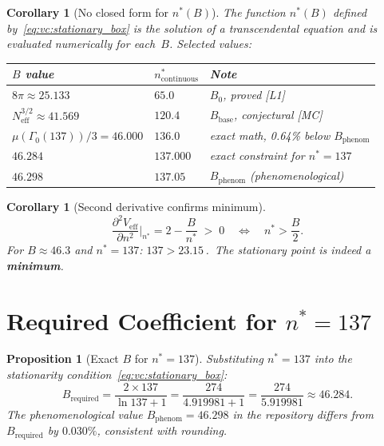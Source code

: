 \documentclass[12pt,a4paper]{article}
\newtheorem{proposition}[theorem]{Proposition}
\newtheorem{corollary}[theorem]{Corollary}
\theoremstyle{definition}
\theoremstyle{remark}
\begin{document}
\begin{corollary}[No closed form for $n^*(B)$]
The function $n^*(B)$ defined by~\eqref{eq:vc:stationary_box} is the solution
of a transcendental equation and is evaluated numerically for each~$B$.
Selected values:
\begin{center}
\begin{tabular}{lll}
\toprule
$B$ value & $n^*_{\mathrm{continuous}}$ & Note \\
\midrule
$8\pi \approx 25.133$ & $65.0$ & $B_0$, proved [L1] \\
$N_{\mathrm{eff}}^{3/2} \approx 41.569$ & $120.4$ & $B_{\mathrm{base}}$, conjectural [MC] \\
$\mu(\Gamma_0(137))/3 = 46.000$ & $136.0$ & exact math, 0.64\% below $B_{\mathrm{phenom}}$ \\
$46.284$ & $137.000$ & exact constraint for $n^* = 137$ \\
$46.298$ & $137.05$ & $B_{\mathrm{phenom}}$ (phenomenological) \\
\bottomrule
\end{tabular}
\end{center}
\end{corollary}

\begin{corollary}[Second derivative confirms minimum]
\label{cor:vc:2nd}
\[
  \frac{\partial^2 V_{\mathrm{eff}}}{\partial n^2}\bigg|_{n^*}
  = 2 - \frac{B}{n^*}
  \;>\; 0
  \quad\Longleftrightarrow\quad
  n^* > \frac{B}{2}.
\]
For $B \approx 46.3$ and $n^* = 137$: $137 > 23.15$\,\checkmark.\
The stationary point is indeed a \textbf{minimum}.
\end{corollary}

\section{Required Coefficient for $n^* = 137$}
\label{sec:vc:B_required}

\begin{proposition}[Exact $B$ for $n^* = 137$]
\label{prop:vc:B_req}
Substituting $n^* = 137$ into the stationarity condition~\eqref{eq:vc:stationary_box}:
\begin{equation}
  B_{\mathrm{required}}
  = \frac{2 \times 137}{\ln 137 + 1}
  = \frac{274}{4.919981 + 1}
  = \frac{274}{5.919981}
  \approx 46.284.
  \label{eq:vc:B_req}
\end{equation}
The phenomenological value $B_{\mathrm{phenom}} = 46.298$ in the repository
differs from $B_{\mathrm{required}}$ by $0.030\%$, consistent with rounding.
\end{proposition}
\end{document}
